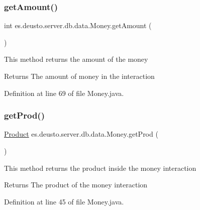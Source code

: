 \subsubsection{\texorpdfstring{get\+Amount()}{getAmount()}}
{\footnotesize\ttfamily int es.\+deusto.\+server.\+db.\+data.\+Money.\+get\+Amount (\begin{DoxyParamCaption}{ }\end{DoxyParamCaption})}

This method returns the amount of the money \begin{DoxyReturn}{Returns}
The amount of money in the interaction 
\end{DoxyReturn}


Definition at line 69 of file Money.\+java.

\mbox{\label{classes_1_1deusto_1_1server_1_1db_1_1data_1_1_money_ab907da0a2fa2c7d42034f323ff1d86a7}} 
\subsubsection{\texorpdfstring{get\+Prod()}{getProd()}}
{\footnotesize\ttfamily \hyperlink{classes_1_1deusto_1_1server_1_1db_1_1data_1_1_product}{Product} es.\+deusto.\+server.\+db.\+data.\+Money.\+get\+Prod (\begin{DoxyParamCaption}{ }\end{DoxyParamCaption})}

This method returns the product inside the money interaction \begin{DoxyReturn}{Returns}
The product of the money interaction 
\end{DoxyReturn}


Definition at line 45 of file Money.\+java.

\mbox{\label{classes_1_1deusto_1_1server_1_1db_1_1data_1_1_money_a4e51e8a920ff96f945c59693c7bf08ad}} 
